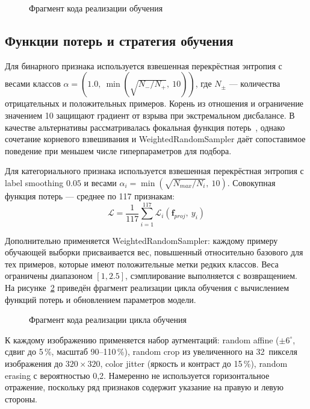 \begin{figure}
    
    \caption{Фрагмент кода реализации обучения}
    \label{src:src3}
\end{figure}

\subsection{Функции потерь и стратегия обучения}

Для бинарного признака используется взвешенная перекрёстная энтропия с весами классов $\alpha = (1.0,\ \min(\sqrt{N_-/N_+},\ 10))$, где $N_\pm$ --- количества отрицательных и положительных примеров. Корень из отношения и ограничение значением 10 защищают градиент от взрыва при экстремальном дисбалансе. В качестве альтернативы рассматривалась фокальная функция потерь~\cite{focal-loss}, однако сочетание корневого взвешивания и WeightedRandomSampler даёт сопоставимое поведение при меньшем числе гиперпараметров для подбора.

Для категориального признака используется взвешенная перекрёстная энтропия с label smoothing $0.05$ и весами $\alpha_i = \min(\sqrt{N_{max}/N_i},\ 10)$. Совокупная функция потерь --- среднее по 117 признакам:
\begin{equation}
\mathcal{L} = \frac{1}{117} \sum_{i=1}^{117} \mathcal{L}_i(\mathbf{f}_{proj},\ y_i)
\end{equation}

Дополнительно применяется WeightedRandomSampler: каждому примеру обучающей выборки присваивается вес, повышенный относительно базового для тех примеров, которые имеют положительные метки редких классов. Веса ограничены диапазоном $[1, 2.5]$, сэмплирование выполняется с возвращением. На рисунке~\ref{src:src4} приведён фрагмент реализации цикла обучения с вычислением функций потерь и обновлением параметров модели.

\begin{figure}
    
    \caption{Фрагмент кода реализации цикла обучения}
    \label{src:src4}
\end{figure}

К каждому изображению применяется набор аугментаций: random affine ($\pm6^\circ$, сдвиг до 5\,\%, масштаб 90--110\,\%), random crop из увеличенного на 32~пикселя изображения до $320\times320$, color jitter (яркость и контраст до 15\,\%), random erasing с вероятностью 0,2. Намеренно не используется горизонтальное отражение, поскольку ряд признаков содержит указание на правую и левую стороны.


